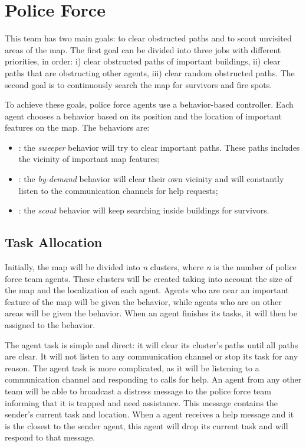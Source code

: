 \section{Police Force}
\label{sec:police}
This team has two main goals: to clear obstructed paths and to scout unvisited areas of the map. The first goal can be divided into three jobs with different priorities, in order: i) clear obstructed paths of important buildings, ii) clear paths that are obstructing other agents, iii) clear random obstructed paths. The second goal is to continuously search the map for survivors and fire spots.

To achieve these goals, police force agents use a behavior-based controller. Each agent chooses a behavior based on its position and the location of important features on the map. The behaviors are:

\begin{itemize}

  \item {}: the \textit{sweeper} behavior will try to clear important paths. These paths includes the vicinity of important map features;

  \item {}: the \textit{by-demand} behavior will clear their own vicinity and will constantly listen to the communication channels for help requests;

  \item {}: the \textit{scout} behavior will keep searching inside buildings for survivors.

\end{itemize}


\subsection{Task Allocation}
Initially, the map will be divided into \emph{n} clusters, where \emph{n} is the number of police force team agents. These clusters will be created taking into account the size of the map and the localization of each agent. Agents who are near an important feature of the map will be given the  behavior, while agents who are on other areas will be given the  behavior. When an agent finishes its tasks, it will then be assigned to the  behavior.

The  agent task is simple and direct: it will clear its cluster's paths until all paths are clear. It will not listen to any communication channel or stop its task for any reason. The  agent task is more complicated, as it will be listening to a communication channel and responding  to calls for help. An agent from any other team will be able to broadcast a distress message to the police force team informing that it is trapped and need assistance. This message contains the sender's current task and location. When a  agent receives a help message and it is the closest to the sender agent, this  agent will drop its current task and will respond to that message.

